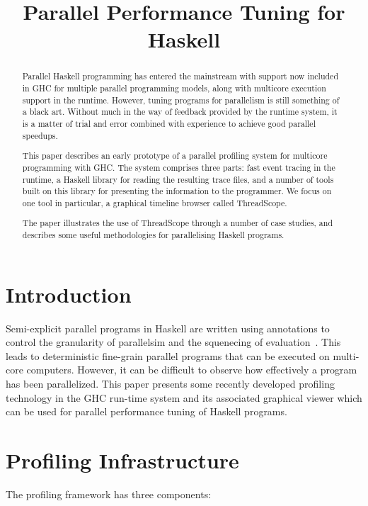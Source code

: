 \documentclass[twocolumn,9pt]{sigplanconf}
\title{Parallel Performance Tuning for Haskell}
\begin{document}
\maketitle

\begin{abstract}
Parallel Haskell programming has entered the mainstream with support
now included in GHC for multiple parallel programming models, along
with multicore execution support in the runtime.  However, tuning
programs for parallelism is still something of a black art.  Without
much in the way of feedback provided by the runtime system, it is a
matter of trial and error combined with experience to achieve good
parallel speedups.

This paper describes an early prototype of a parallel profiling system
for multicore programming with GHC.  The system comprises three parts:
fast event tracing in the runtime, a Haskell library for reading the
resulting trace files, and a number of tools built on this library for
presenting the information to the programmer.  We focus on one tool in
particular, a graphical timeline browser called ThreadScope.

The paper illustrates the use of ThreadScope through a number of case
studies, and describes some useful methodologies for parallelising
Haskell programs.
\end{abstract}


\section{Introduction}
Semi-explicit parallel programs in Haskell are written using annotations to control the granularity of parallelsim and the squenecing of evaluation~\cite{spj:trin98b}. This leads to deterministic fine-grain parallel programs that can be executed on multi-core computers. However, it can be difficult to observe how effectively a program has been parallelized. This paper presents some recently developed profiling technology in the GHC run-time system and its associated graphical viewer which can be used for parallel performance tuning of Haskell programs.



\section{Profiling Infrastructure}
The profiling framework has three components:
\end{document}
